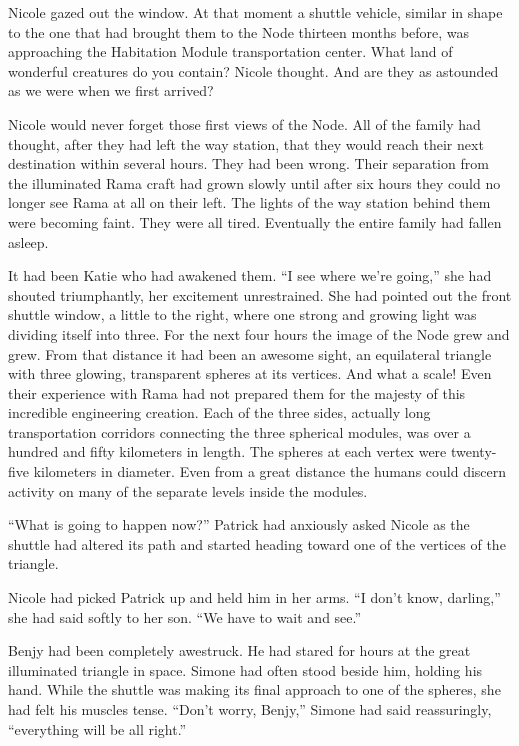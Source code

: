 \documentclass[]{article}
\begin{document}
{Nicole gazed out the window. At that moment a shuttle vehicle, similar in shape to the one that had brought them to the Node thirteen months before, was approaching the Habitation Module transportation center. What land of wonderful creatures do you contain? Nicole thought. And are they as astounded as we were when we first arrived?

Nicole would never forget those first views of the Node. All of the family had thought, after they had left the way station, that they would reach their next destination within several hours. They had been wrong. Their separation from the illuminated Rama craft had grown slowly until after six hours they could no longer see Rama at all on their left. The lights of the way station behind them were becoming faint. They were all tired. Eventually the entire family had fallen asleep.

It had been Katie who had awakened them. “I see where we’re going,” she had shouted triumphantly, her excitement unrestrained. She had pointed out the front shuttle window, a little to the right, where one strong and growing light was dividing itself into three. For the next four hours the image of the Node grew and grew. From that distance it had been an awesome sight, an equilateral triangle with three glowing, transparent spheres at its vertices. And what a scale! Even their experience with Rama had not prepared them for the majesty of this incredible engineering creation. Each of the three sides, actually long transportation corridors connecting the three spherical modules, was over a hundred and fifty kilometers in length. The spheres at each vertex were twenty-five kilometers in diameter. Even from a great distance the humans could discern activity on many of the separate levels inside the modules.

“What is going to happen now?” Patrick had anxiously asked Nicole as the shuttle had altered its path and started heading toward one of the vertices of the triangle.

Nicole had picked Patrick up and held him in her arms. “I don’t know, darling,” she had said softly to her son. “We have to wait and see.”

Benjy had been completely awestruck. He had stared for hours at the great illuminated triangle in space. Simone had often stood beside him, holding his hand. While the shuttle was making its final approach to one of the spheres, she had felt his muscles tense. “Don’t worry, Benjy,” Simone had said reassuringly, “everything will be all right.”

}
\end{document}
